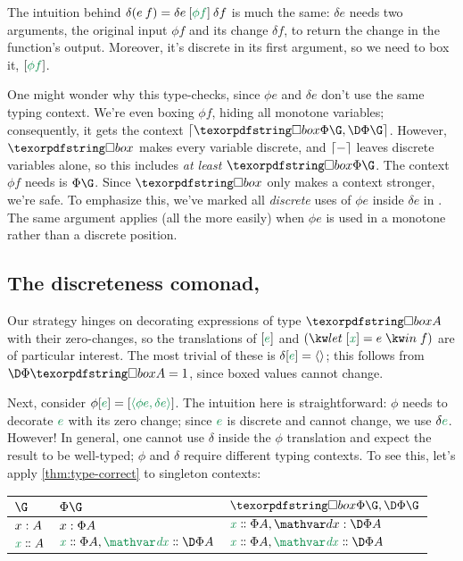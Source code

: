 The intuition behind $\delta(e\<f) = \delta e \<\ebox{\phi f} \<\delta f$ is
much the same: $\delta e$ needs two arguments, the original input $\phi f$ and
its change $\delta f$, to return the change in the function's output. Moreover,
it's discrete in its first argument, so we need to box it, $\ebox{\phi f}$.

One might wonder why this type-checks, since $\phi e$ and $\delta e$ don't use
the same typing context.
%
We're even boxing $\phi f$, hiding all monotone variables; consequently, it gets
the context $\stripcxraw{\iso\Phi\G, \DP\G}$.
%
However, $\iso$ makes every variable discrete, and $\lceil{-}\rceil$ leaves
discrete variables alone, so this includes \emph{at least} $\iso\Phi\G$. The
context $\phi f$ needs is $\Phi\G$. Since $\iso$ only makes a context stronger,
we're safe.
%
To emphasize this, we've marked all \emph{discrete} uses of $\phi e$ inside
$\delta e$ in .
%
The same argument applies (all the more easily) when $\phi e$ is used in a
monotone rather than a discrete position.



\subsection{The discreteness comonad, \iso}

Our strategy hinges on decorating expressions of type $\iso A$ with their
zero-changes, so the translations of $\ebox e$ and $(\eletbox x e f)$ are of
particular interest.
%
The most trivial of these is $\delta\ebox{e} = \etuple{}$; this follows from
$\DP\iso A = \tunit$, since boxed values cannot change.

Next, consider \(\phi\ebox e = \ebox{\etuple{\phi e, \delta e}}\).
%
The intuition here is straightforward: $\phi$ needs to decorate $\isocolor e$
with its zero change; since $\isocolor e$ is discrete and cannot change, we use
$\delta \isocolor e$.
%
However! In general, one cannot use $\delta$ inside the $\phi$ translation and
expect the result to be well-typed; $\phi$ and $\delta$ require different typing
contexts. To see this, let's apply \cref{thm:type-correct} to singleton
contexts:

\begin{center}
  \setlength\tabcolsep{10pt}
  \begin{tabular}{@{}lll@{}}
    $\G$ & $\Phi\G$ & $\iso\Phi\G,\DP\G$
    \\
    \midrule
    ${x} : {A}$ & ${x} : {\Phi A}$ & $\hd x {\Phi A}, \h\dx{\DP A}$
    \\
    $\hd x A$
    & $\hd x {\Phi A}, \hd\dx{\DP A}$
    & $\hd x {\Phi A}, \hd\dx{\DP A}$
  \end{tabular}
\end{center}

